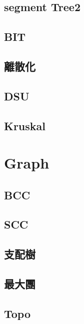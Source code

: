 \documentclass[a4paper,10pt,twocolumn,oneside]{article}
\begin{document}
    \subsection{segment Tree2}
    

    \subsection{BIT}
    

    \subsection{離散化}
    

    \subsection{DSU}
    

    \subsection{Kruskal}
    

\section{Graph}
    \subsection{BCC}
    

    \subsection{SCC}
    

    \subsection{支配樹}
    

    \subsection{最大團}
    

    \subsection{Topo}
    
\end{document}
